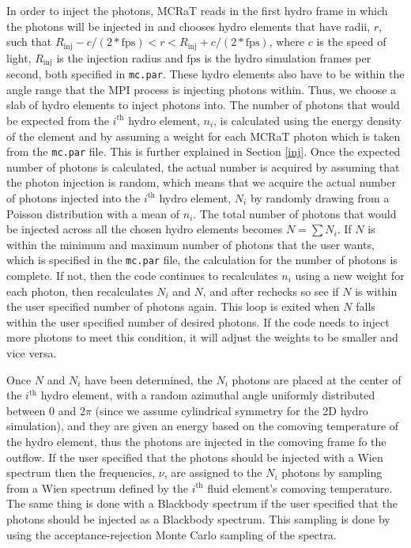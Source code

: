 \documentclass[12pt,a4paper]{article}
\begin{document}
In order to inject the photons, MCRaT reads in the first hydro frame in which the photons will be injected in and chooses hydro elements that have radii, $r$, such that $R_\mathrm{inj}-c/(2*\mathrm{fps}) < r < R_\mathrm{inj}+c/(2*\mathrm{fps})$, where $c$ is the speed of light, $R_\mathrm{inj}$ is the injection radius and $\mathrm{fps}$ is the hydro simulation frames per second, both specified in \texttt{mc.par}. These hydro elements also have to be within the angle range that the MPI process is injecting photons within. Thus, we choose a slab of hydro elements to inject photons into. The number of photons that would be expected from the $i^\mathrm{th}$ hydro element, $n_i$, is calculated using the energy density of the element and by assuming a weight for each MCRaT photon which is taken from the \texttt{mc.par} file. This is further explained in Section \ref{inj}. Once the expected number of photons is calculated, the actual number is acquired by assuming that the photon injection is random, which means that we acquire the actual number of photons injected into the $i^\mathrm{th}$ hydro element, $N_i$ by randomly drawing from a Poisson distribution with a mean of $n_i$. The total number of photons that would be injected across all the chosen hydro elements becomes $N=\sum N_i$. If $N$ is within the minimum and maximum number of photons that the user wants, which is specified in the \texttt{mc.par} file, the calculation for the number of photons is complete. If not, then the code continues to recalculates $n_i$ using a new weight for each photon, then recalculates $N_i$ and $N$, and after rechecks so see if $N$ is within the user specified number of photons again. This loop is exited when $N$ falls within the user specified number of desired photons. If the code needs to inject more photons to meet this condition, it will adjust the weights to be smaller and vice versa.

Once $N$ and $N_i$ have been determined, the $N_i$ photons are placed at the center of the $i^\mathrm{th}$ hydro element, with a random azimuthal angle uniformly distributed between $0$ and $2\pi$ (since we assume cylindrical symmetry for the 2D hydro simulation), and they are given an energy based on the comoving temperature of the hydro element, thus the photons are injected in the comoving frame fo the outflow. If the user specified that the photons should be injected with a Wien spectrum then the frequencies, $\nu$, are assigned to the $N_i$ photons by sampling from a Wien spectrum defined by the $i^\mathrm{th}$ fluid element's comoving temperature. The same thing is done with a Blackbody spectrum if the user specified that the photons should be injected as a Blackbody spectrum. This sampling is done by using the acceptance-rejection Monte Carlo sampling of the spectra.
\end{document}
